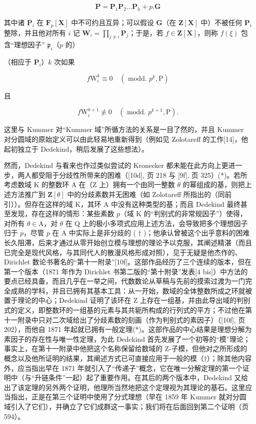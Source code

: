 \[
\mathbf {P} = \mathbf {P} _ {1} \mathbf {P} _ {2} \dots \mathbf {P} _ {h} + p. \mathbf {G}
\]

其中诸 \(\overline{\mathbf{P}}_i\) 在 \(\mathbf{F}_p[\mathbf{X}]\) 中不可约且互异；可以假设 \(\mathbf{G}\)（在 \(\mathbf{Z}[\mathbf{X}]\) 中）不被任何 \(\mathbf{P}_i\) 整除，并且他对所有 \(i\) 记 \(\mathbf{W}_i = \prod_{j\neq i}\mathbf{P}_j\)；于是，若 \(f\in \mathbf{Z}[\mathbf{X}]\)，则称 \(f(\xi)\) 包含“理想因子” \(\mathfrak{p}_i\)（\(p\) 的）

（相应于 \(\mathbf{P}_i\)）\(k\) 次如果

\[
f \mathrm{W} _ {i} ^ {k} \equiv 0 \quad (\text { modd. } p ^ {k}, \mathrm{P})
\]

且

\[
f \mathrm{W} _ {i} ^ {k + 1} \not \equiv 0 \quad (\text { modd. } p ^ {k + 1}, \mathrm{P}).
\]

这里与 Kummer 对“Kummer 域”所循方法的关系是一目了然的，并且 Kummer 对分圆域的原始定义可以由此轻易地重新得到（例如见 Zolotareff 的工作{[}14{]}，他起初独立于 Dedekind，稍后发展了这些想法）。

然而，Dedekind 与看来也作过类似尝试的 Kronecker 都未能在此方向上更进一步，两人都受阻于分歧性所带来的困难（{[}10d{]}, 页 218 与 {[}9f{]}, 页 325）(*)。若所考虑数域 K 的整数环 A 在（Z 上）拥有一个由同一整数 \(\theta\) 的幂组成的基，则把上述方法推广到 \(\mathbf{Z}[\theta]\) 中的分歧素数并无困难（如 Zolotareff 所指出的（同前引））。但存在这样的域 K，其环 A 中没有这种类型的基；而且 Dedekind 最终甚至发现，存在这样的情形：某些素数 \(p\)（域 K 的“判别式的非常规因子”）使得，对所有 \(\theta \in \mathrm{A}\)，对 \(\theta\) 在 Q 上的极小多项式应用上述方法，会导致把多个理想因子归于 \(p\)，尽管 \(p\) 在 A 中实际上是非分歧的 ( \(\dagger\) )；他承认曾被这个出乎意料的困难长久阻滞，后来才通过从零开始创立模与理想的理论予以克服，其阐述精湛（而且已完全是现代风格，与其同代人的散漫风格形成对照），见于无疑是他杰作的、Dirichlet 数论书著名的“第十一附录”{[}10f{]}。这部作品经历了三个连续的版本，但在第一个版本（1871 年作为 Dirichlet 书第二版的“第十附录”发表{[}4 bis{]}）中方法的要点已经具备，而且几乎在一举之间，代数数论从草稿与先前的摸索过渡为一门完全成熟的学科，并且已拥有其基本工具：从一开始，数域的全体整数所成之环就被置于理论的中心；Dedekind 证明了该环在 Z 上存在一组基，并由此导出域的判别式的定义，即整数环的一组基的元素与其共轭所构成的行列式的平方；不过他在第十一附录中只对二次域给出了分歧素数的刻画（作为判别式的素因子）（{[}10f{]}, 页 202），而他自 1871 年起就已拥有一般定理(*)。这部作品的中心结果是理想分解为素因子的存在性与唯一性定理，为此 Dedekind 首先发展了一个初等的“模”理论；事实上，在第十一附录中他把这个名称保留给数域的 Z-子模，但他对之所形成的概念以及他所证明的结果，其阐述方式已可直接应用于一般的模（†）；除其他内容外，应当指出早在 1871 年就引入了“传递子”概念，它在唯一分解定理的第一个证明中（与“升链条件”一起）起了重要作用。在其后的两个版本中，Dedekind 又给出了该定理的另外两个证明，他理所当然地把这个定理视为其理论的基石。这里应当指出，正是在第三个证明中使用了分式理想（早在 1859 年 Kummer 就对分圆域引入了它们），并确立了它们成群这一事实；我们将在后面回到第二个证明（页 594）。

